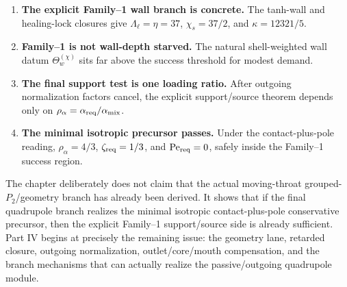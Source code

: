 \begin{enumerate}[leftmargin=2.2em]
  \item \textbf{The explicit Family--1 wall branch is concrete.}  The tanh-wall and healing-lock closures give \(\Lambda_\ell=\eta=37\), \(\chi_s=37/2\), and \(\kappa=12321/5\).
  \item \textbf{Family--1 is not wall-depth starved.}  The natural shell-weighted wall datum \(\Theta_w^{(\chi)}\) sits far above the success threshold for modest demand.
  \item \textbf{The final support test is one loading ratio.}  After outgoing normalization factors cancel, the explicit support/source theorem depends only on \(\rho_\alpha=\alpha_{\rm req}/\alpha_{\rm mix}\).
  \item \textbf{The minimal isotropic precursor passes.}  Under the contact-plus-pole reading, \(\rho_\alpha=4/3\), \(\zeta_{\rm req}=1/3\), and \(\mathrm{Pe}_{\rm req}=0\), safely inside the Family--1 success region.
\end{enumerate}

The chapter deliberately does not claim that the actual moving-throat grouped-\(P_2\)/geometry branch has already been derived.  It shows that if the final quadrupole branch realizes the minimal isotropic contact-plus-pole conservative precursor, then the explicit Family--1 support/source side is already sufficient.  Part IV begins at precisely the remaining issue: the geometry lane, retarded closure, outgoing normalization, outlet/core/mouth compensation, and the branch mechanisms that can actually realize the passive/outgoing quadrupole module.

